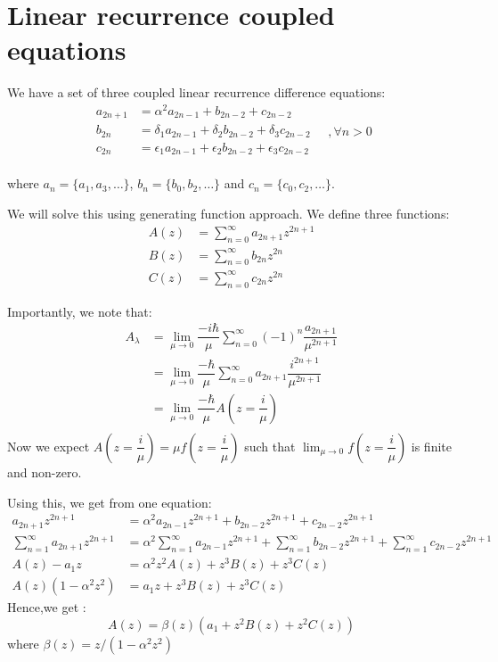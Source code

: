 \documentclass[11pt,a4paper]{article}
\begin{document}
\appendix

\section{Linear recurrence coupled equations}
We have a set of three coupled linear recurrence difference equations:
\begin{equation}
\boxed{
\begin{aligned}
a_{2n+1}&= \alpha^2 a_{2n-1} + b_{2n-2} + c_{2n-2} \\
b_{2n}&= \delta_1 a_{2n-1} + \delta_2 b_{2n-2} + \delta_3 c_{2n-2} \\
c_{2n} &= \epsilon_1 a_{2n-1} + \epsilon_2 b_{2n-2} + \epsilon_3 c_{2n-2}\\
\end{aligned}}
\quad , \forall n >0
\end{equation}

where $a_n= \{a_1, a_3, \ldots\}$, $b_n= \{b_0, b_2, \ldots\}$ and $c_n= \{c_0, c_2, \ldots\}$.


We will solve this using generating function approach. We define three functions:
\begin{align}
A(z)&= \sum_{n=0}^{\infty} a_{2n+1}z^{2n+1}\\
 B(z)&= \sum_{n=0}^{\infty} b_{2n}z^{2n}\\
C(z)&= \sum_{n=0}^{\infty} c_{2n}z^{2n}
\end{align}

Importantly, we note that:
\begin{align*}
A_{\lambda} & =   \lim_{\mu \rightarrow 0}  \dfrac{-i\hbar}{\mu}  \sum_{n=0}^{\infty} (-1)^{n} \dfrac{ a_{2n+1}}{\mu^{2n+1}}\\
& =   \lim_{\mu \rightarrow 0}  \dfrac{-\hbar}{\mu}  \sum_{n=0}^{\infty}  a_{2n+1} \dfrac{i^{2n+1} }{\mu^{2n+1}}\\
&=   \lim_{\mu \rightarrow 0}  \dfrac{-\hbar}{\mu}  A\left( z=\dfrac{i}{\mu}\right)\\
\end{align*}
Now we expect $ A\left( z=\dfrac{i}{\mu}\right)= \mu f(z=\dfrac{i}{\mu})$ such that $\lim_{\mu \rightarrow 0} f(z=\dfrac{i}{\mu}) $ is finite and non-zero.


Using this, we get from one equation:
\begin{align}
a_{2n+1}  z^{2n+1}&= \alpha^2 a_{2n-1} z^{2n+1} + b_{2n-2} z^{2n+1} + c_{2n-2} z^{2n+1}\\
\sum_{n=1}^{\infty} a_{2n+1}  z^{2n+1}&= \alpha^2  \sum_{n=1}^{\infty} a_{2n-1} z^{2n+1} +  \sum_{n=1}^{\infty} b_{2n-2} z^{2n+1} +  \sum_{n=1}^{\infty}c_{2n-2} z^{2n+1}\\
A(z) -a_1 z &=\alpha^2  z^2 A(z) +  z^3 B(z) + z^3 C(z)\\
A(z)(1 -\alpha^2  z^2 )  &=  a_1 z +  z^3 B(z) + z^3 C(z)
\end{align}
Hence,we get :
\begin{equation}
\boxed{A(z) =  \beta(z) (a_1  +  z^2 B(z) + z^2 C(z))}
\end{equation}
where $\beta(z)= z/(1 -\alpha^2  z^2 )$
\end{document}
